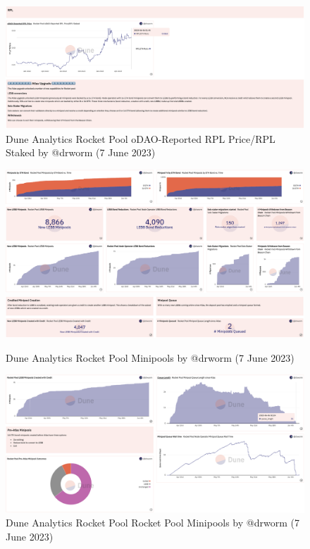\documentclass[UTF8]{article}
\begin{document}
{\begin{figure}[htbp]
\begin{center}
\includegraphics[width=\linewidth]{images/rocketdrworm9}
\caption{Dune Analytics Rocket Pool oDAO-Reported RPL Price/RPL Staked by @drworm  (7 June 2023)}
\label{fig:rocketdrworm9}
\end{center}
\end{figure}

\begin{figure}[htbp]
\begin{center}
\includegraphics[width=\linewidth]{images/rocketdrworm10}\\
\includegraphics[width=\linewidth]{images/rocketdrworm11}
\caption{Dune Analytics Rocket Pool Minipools by @drworm  (7 June 2023)}
\label{fig:rocketdrworm10}
\end{center}
\end{figure}

\begin{figure}[htbp]
\begin{center}
\includegraphics[width=\linewidth]{images/rocketdrworm12}
\caption{Dune Analytics Rocket Pool Rocket Pool Minipools by @drworm  (7 June 2023)}
\label{fig:rocketdrworm12}
\end{center}
\end{figure}

}
\end{document}
